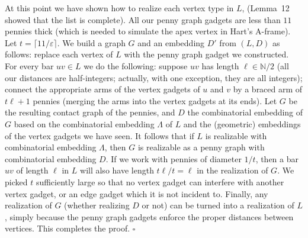 \documentclass{article}
\begin{document}
At this point we have shown how to realize each vertex type in $L$, (Lemma~12 showed that the list is complete).
All our penny graph gadgets are less than $11$ pennies thick (which is needed to simulate the apex vertex in Hart's A-frame). Let $t = \lceil 11/\varepsilon \rceil$. We build a graph $G$ and an embedding $D'$ from $(L,D)$ as follows: replace each vertex of $L$ with the penny graph gadget we constructed. For every bar $uv \in L$ we do the following: 
suppose $uv$ has length $\ell \in \ensuremath{\mathbb{N}}/2$ (all our distances are half-integers; actually, with one exception, they are all integers); connect the appropriate arms of the vertex gadgets of $u$ and $v$ by a braced arm of $t \ell+1$ pennies (merging the arms into the vertex gadgets at its ends). Let $G$ be the resulting contact graph of the pennies, and $D$ the combinatorial 
embedding of $G$ based on the combinatorial embedding $\Lambda$ of $L$ and the (geometric) embeddings of the vertex gadgets we have seen. It follows that if $L$ is realizable with combinatorial embedding $\Lambda$, then $G$ is realizable as a penny graph with combinatorial embedding $D$. If we work with pennies of diameter $1/t$, then a bar $uv$ of length $\ell$ in $L$ will also have length $t \ell/t = \ell$ in the realization of $G$. We picked $t$ sufficiently large so that no vertex gadget can interfere with another vertex gadget, or an edge gadget which it is not incident to. Finally, any realization of $G$ (whether realizing $D$ or not) can be turned into a realization of $L$, simply because the penny graph gadgets enforce the proper distances between vertices. This completes the proof. 
\hfill$\square$\par\medskip
\end{document}
